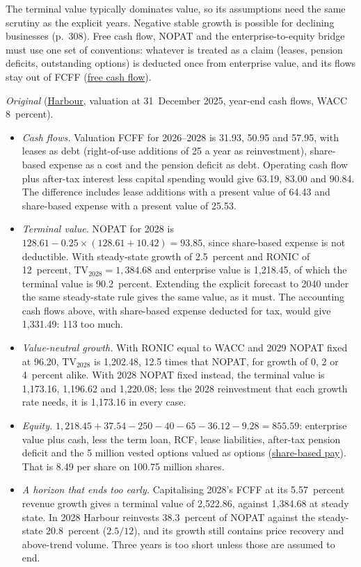 \begin{qfmethod}
 The terminal value typically dominates value, so its assumptions need the same scrutiny as the explicit years. Negative stable growth is possible for declining businesses (p.~308). Free cash flow, NOPAT and the enterprise-to-equity bridge must use one set of conventions: whatever is treated as a claim (leases, pension deficits, outstanding options) is deducted once from enterprise value, and its flows stay out of FCFF (\hyperref[meth:free-cash-flow-coverage]{free cash flow}).

 \emph{Original} (\hyperref[ex:harbour-pro-forma-model]{Harbour}, valuation at 31~December 2025, year-end cash flows, WACC 8~percent).
\begin{itemize}
\item \emph{Cash flows.} Valuation FCFF for 2026--2028 is 31.93, 50.95 and 57.95, with leases as debt (right-of-use additions of 25 a year as reinvestment), share-based expense as a cost and the pension deficit as debt. Operating cash flow plus after-tax interest less capital spending would give 63.19, 83.00 and 90.84. The difference includes lease additions with a present value of 64.43 and share-based expense with a present value of 25.53.
\item \emph{Terminal value.} NOPAT for 2028 is $128.61-0.25\times(128.61+10.42)=93.85$, since share-based expense is not deductible. With steady-state growth of 2.5~percent and RONIC of 12~percent, $\text{TV}_{2028}=1{,}384.68$ and enterprise value is 1{,}218.45, of which the terminal value is 90.2~percent. Extending the explicit forecast to 2040 under the same steady-state rule gives the same value, as it must. The accounting cash flows above, with share-based expense deducted for tax, would give 1{,}331.49: 113 too much.
\item \emph{Value-neutral growth.} With RONIC equal to WACC and 2029 NOPAT fixed at 96.20, $\text{TV}_{2028}$ is 1{,}202.48, 12.5 times that NOPAT, for growth of 0, 2 or 4~percent alike. With 2028 NOPAT fixed instead, the terminal value is 1{,}173.16, 1{,}196.62 and 1{,}220.08; less the 2028 reinvestment that each growth rate needs, it is 1{,}173.16 in every case.
\item \emph{Equity.} $1{,}218.45+37.54-250-40-65-36.12-9.28=855.59$: enterprise value plus cash, less the term loan, RCF, lease liabilities, after-tax pension deficit and the 5 million vested options valued as options (\hyperref[meth:share-based-compensation-modelling]{share-based pay}). That is 8.49 per share on 100.75 million shares.
\item \emph{A horizon that ends too early.} Capitalising 2028's FCFF at its 5.57~percent revenue growth gives a terminal value of 2{,}522.86, against 1{,}384.68 at steady state. In 2028 Harbour reinvests 38.3~percent of NOPAT against the steady-state 20.8~percent ($2.5/12$), and its growth still contains price recovery and above-trend volume. Three years is too short unless those are assumed to end.
\end{itemize}


\end{qfmethod}
